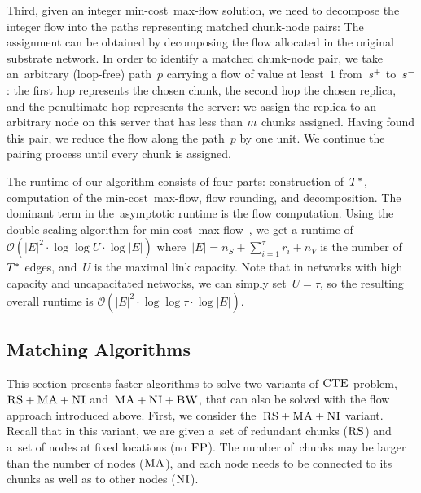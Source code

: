 Third, given an integer min-cost~max-flow solution, we need to decompose
the integer flow into the paths
representing matched chunk-node pairs:
The assignment can be obtained by decomposing the flow allocated in the
original substrate network. In order to identify a matched chunk-node pair,
we take an~arbitrary (loop-free) path~$p$ carrying a flow of value at least~$1$ from~$s^{+}$ to~$s^{-}$:
the first hop represents the chosen chunk, the second hop the chosen
replica, and the penultimate hop represents the server: we assign
the replica to an arbitrary node on this server that has less than $m$ chunks assigned.
Having found this pair, we reduce the flow
along the path~$p$ by one unit.
We continue the pairing process until every chunk is assigned.

The runtime of our algorithm consists of four parts: construction of~$T^*$,
computation of the min-cost~max-flow, flow rounding, and decomposition. The
dominant term in the~asymptotic runtime is the flow computation.
Using the double scaling algorithm for min-cost~max-flow~\cite{mincostmaxflow-state}, we get a runtime of~$\mathcal{O}(|E|^2 \cdot\log\log U \cdot \log |E|)$
where~$|E| = n_S+\sum_{i=1}^\tau r_i + n_V$ is the number of $T^*$ edges, and~$U$ is the maximal link capacity. Note that in networks with high capacity
and uncapacitated networks, we can simply set~$U=\tau$, so the resulting overall runtime is $\mathcal{O}(|E|^2 \cdot\log\log \tau \cdot \log |E|)$.


\subsection{Matching Algorithms}\label{ssec:match}


This section presents faster algorithms to solve 
two variants of $\textsc{CTE}$ problem, $\textsc{RS}+\textsc{MA}+\textsc{NI}$ and~$\textsc{MA}+\textsc{NI}+\textsc{BW}$, that can also be solved with the flow approach
introduced above.
First, we consider the~$\textsc{RS}+\textsc{MA}+\textsc{NI}$ variant.
Recall that in this variant,
we are given a~set of redundant chunks ($\textsc{RS}$) and a~set of nodes
at fixed locations (no $\textsc{FP}$). The number of~chunks may be larger than the number
of nodes ($\textsc{MA}$), and each node needs to be connected
to its chunks as well as to other nodes ($\textsc{NI}$).

